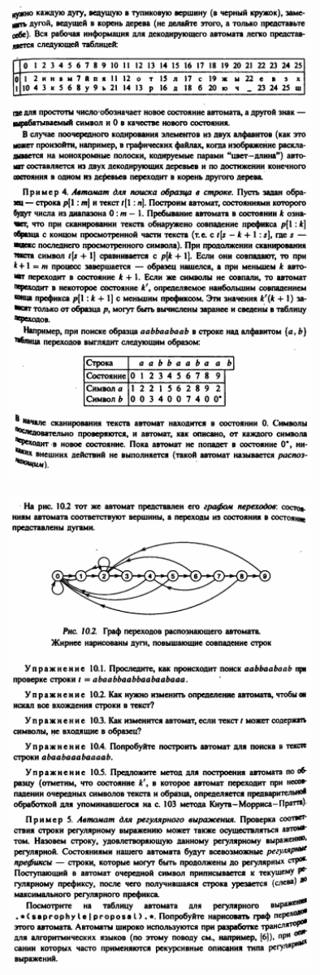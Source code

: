\documentclass[discrete.tex]{subfiles}
\begin{document}
  \begin{figure}[H]
          \includegraphics[width=10cm]{pics/59_5}
          \centering
  \end{figure}

  \begin{figure}[H]
          \includegraphics[width=10cm]{pics/59_6}
          \centering
  \end{figure}
\end{document}
